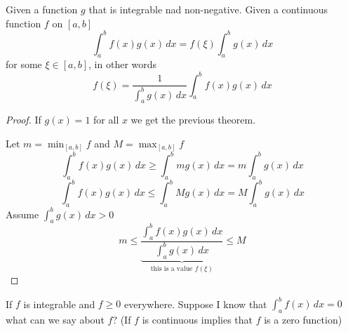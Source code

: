 \begin{theorem*}
  Given a function $g$ that is integrable nad non-negative. 
  Given a continuous function $f$ on $[a, b]$ 
  \[\int_a^b f(x)g(x)\,dx = f(\xi)\int_a^b g(x)\,dx\]
  for some $\xi \in [a, b]$, in other words
  \[ f(\xi) = \frac{1}{\int_a^b g(x)\,dx} \displaystyle\int_a^b f(x)g(x)\,dx\]
\end{theorem*}

\begin{proof}
  If $g(x) = 1$ for all $x$ we get the previous theorem.

  Let $m = \min_{[a, b]} f$ and $M = \max_{[a, b]} f$
  \[ \int_a^b f(x)g(x)\,dx \ge \int_a^b mg(x)\,dx = m\int_a^bg(x)\,dx\]
  \[ \int_a^b f(x)g(x)\,dx \le \int_a^b Mg(x)\,dx = M\int_a^bg(x)\,dx\]
  Assume $\displaystyle \int_a^b g(x)\, dx > 0$
  \[m \le \underbrace{\frac{\displaystyle\int_a^b f(x)g(x)\,dx}{\displaystyle\int_a^b g(x) \,dx}}_{\text{this is a value } f(\xi)} \le M\]
\end{proof}

If $f$ is integrable and $f \ge 0$ everywhere.
Suppose I know that $\int_a^b f(x)\,dx = 0$
what can we say about $f$?
(If $f$ is continuous implies that $f$ is a zero function)


